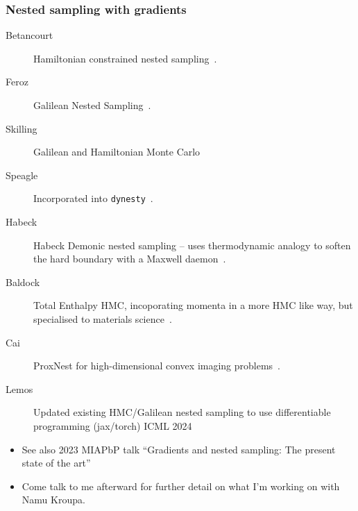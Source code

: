 \documentclass[aspectratio=169]{beamer}
\begin{document}
\begin{frame}
    \frametitle{Nested sampling with gradients}
    \begin{description}
        \item[Betancourt] Hamiltonian constrained nested sampling~.
        \item[Feroz] Galilean Nested Sampling~.
        \item[Skilling] Galilean and Hamiltonian Monte Carlo~
        \item[Speagle] Incorporated into \texttt{dynesty}~.
        \item[Habeck] Habeck Demonic nested sampling -- uses thermodynamic analogy to soften the hard boundary with a Maxwell daemon~.
        \item[Baldock] Total Enthalpy HMC, incoporating momenta in a more HMC like way, but specialised to materials science~.
        \item[Cai] ProxNest for high-dimensional convex imaging problems~.
        \item[Lemos] Updated existing HMC/Galilean nested sampling to use differentiable programming (jax/torch) ICML 2024~
    \end{description}
    \begin{itemize}
        \item See also 2023 MIAPbP talk ``Gradients and nested sampling: The present state of the art''
        \item Come talk to me afterward for further detail on what I'm working on with Namu Kroupa.
    \end{itemize}
\end{frame}
\end{document}
